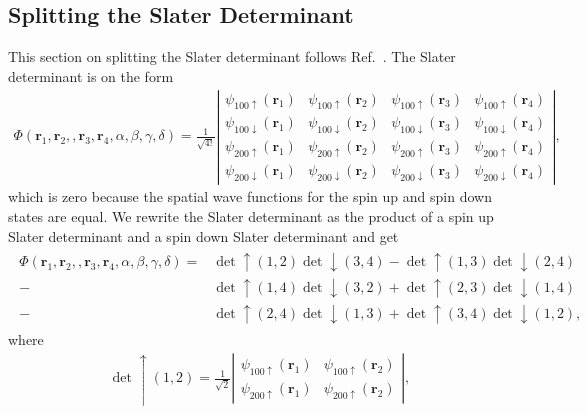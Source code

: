 \documentclass[../main.tex]{subfiles}
\begin{document}
\subsection{Splitting the Slater Determinant}
This section on splitting the Slater determinant follows Ref.~\cite{FYS4411-Slides}.
The Slater determinant is on the form 
\begin{align}
    \Phi(\mathbf{r}_1,\mathbf{r}_2,,\mathbf{r}_3,\mathbf{r}_4, \alpha,\beta,\gamma,\delta)=\frac{1}{\sqrt{4!}}
\left| \begin{array}{cccc} \psi_{100\uparrow}(\mathbf{r}_1)& \psi_{100\uparrow}(\mathbf{r}_2)& \psi_{100\uparrow}(\mathbf{r}_3)&\psi_{100\uparrow}(\mathbf{r}_4) \\
\psi_{100\downarrow}(\mathbf{r}_1)& \psi_{100\downarrow}(\mathbf{r}_2)& \psi_{100\downarrow}(\mathbf{r}_3)&\psi_{100\downarrow}(\mathbf{r}_4) \\
\psi_{200\uparrow}(\mathbf{r}_1)& \psi_{200\uparrow}(\mathbf{r}_2)& \psi_{200\uparrow}(\mathbf{r}_3)&\psi_{200\uparrow}(\mathbf{r}_4) \\
\psi_{200\downarrow}(\mathbf{r}_1)& \psi_{200\downarrow}(\mathbf{r}_2)& \psi_{200\downarrow}(\mathbf{r}_3)&\psi_{200\downarrow}(\mathbf{r}_4) \end{array} \right|, 
\end{align}
which is zero because the spatial wave functions for the spin up and spin down states are equal. We rewrite the Slater determinant as the product of a spin up Slater determinant and a spin down Slater determinant and get 
\begin{align}
\begin{split}
    \Phi(\mathbf{r}_1,\mathbf{r}_2,,\mathbf{r}_3,\mathbf{r}_4, \alpha,\beta,\gamma,\delta)=&\det\uparrow(1,2)\det\downarrow(3,4)-\det\uparrow(1,3)\det\downarrow(2,4)\\
    -&\det\uparrow(1,4)\det\downarrow(3,2)+\det\uparrow(2,3)\det\downarrow(1,4)\\
    -&\det\uparrow(2,4)\det\downarrow(1,3)+\det\uparrow(3,4)\det\downarrow(1,2),
\end{split}
\end{align}
where
\begin{align}
    \det\uparrow(1,2)=\frac{1}{\sqrt{2}}\left| \begin{array}{cc} \psi_{100\uparrow}(\mathbf{r}_1)& \psi_{100\uparrow}(\mathbf{r}_2)\\
    \psi_{200\uparrow}(\mathbf{r}_1)& \psi_{200\uparrow}(\mathbf{r}_2) \end{array} \right|,
\end{align}
\end{document}
